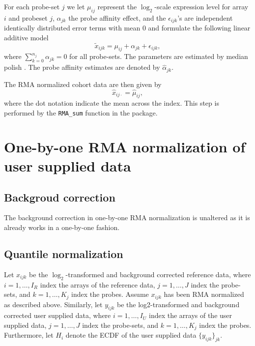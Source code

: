 \documentclass{article}
\begin{document}
For each probe-set $j$ we let $\mu_{ij}$ represent the $\log_2$-scale expression level for array $i$ and probeset $j$, $\alpha_{jk}$ the probe affinity effect, and the $\epsilon_{ijk}$'s are independent identically distributed  error terms with mean 0 and formulate the following linear additive model
\begin{equation*}
   \tilde{x}_{ijk} = \mu_{ij} + \alpha_{jk}+ \epsilon_{ijk},
\end{equation*}
where $\sum_{k=0}^{n_j} \alpha_{jk} = 0$ for all probe-sets. The parameters are estimated by median polish \citep{Holder2001}. The probe affinity estimates are denoted by $\hat{\alpha}_{jk}$.

The RMA normalized cohort data are then given by
\begin{equation*}
   \hat{x}_{ij\cdot} = \hat{\mu}_{ij},
\end{equation*}
where the dot notation indicate the mean across the index.
This step is performed by the \texttt{RMA\_sum} function in the \hemaClass{} package.




\section{One-by-one RMA normalization of user supplied data}
\subsection{Backgroud correction}

The background correction in one-by-one RMA normalization is unaltered as it is already works in a one-by-one fashion.


\subsection{Quantile normalization}

Let $x_{ijk}$ be the $\log_2$-transformed and background corrected reference data, where $i = 1,\dots,I_R$ index the arrays of the reference data, $j=1,\dots,J$  index the probe-sets, and $k=1,\dots,K_j$ index the probes. Assume $x_{ijk}$ has been RMA normalized as described above. Similarly,  let $y_{ijk}$ be the log2-transformed and background corrected user supplied data, where $i = 1,\dots,I_U$ index the arrays of the user supplied data, $j=1,\dots,J$  index the probe-sets, and $k=1,\dots,K_j$ index the probes. Furthermore, let $H_i$ denote the ECDF of the user supplied data $\{y_{ijk}\}_{jk}$.
\end{document}
